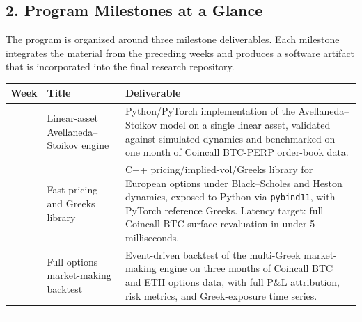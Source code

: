 \documentclass[
]{article}
\newcounter{none} %
\begin{document}
\subsection{2. Program Milestones at a
Glance}\label{program-milestones-at-a-glance}

The program is organized around three milestone deliverables. Each
milestone integrates the material from the preceding weeks and produces
a software artifact that is incorporated into the final research
repository.

{\def\LTcaptype{none} %
\begin{longtable}[]{@{}
  >{\raggedright\arraybackslash}p{}
  >{\raggedright\arraybackslash}p{}
  >{\raggedright\arraybackslash}p{}@{}}
\toprule\noalign{}
\begin{minipage}[b]{\linewidth}\raggedright
Week
\end{minipage} & \begin{minipage}[b]{\linewidth}\raggedright
Title
\end{minipage} & \begin{minipage}[b]{\linewidth}\raggedright
Deliverable
\end{minipage} \\
\midrule\noalign{}
\endhead
\bottomrule\noalign{}
\endlastfoot
5 & Linear-asset Avellaneda--Stoikov engine & Python/PyTorch
implementation of the Avellaneda--Stoikov model on a single linear
asset, validated against simulated dynamics and benchmarked on one month
of Coincall BTC-PERP order-book data. \\
7 & Fast pricing and Greeks library & C++ pricing/implied-vol/Greeks
library for European options under Black--Scholes and Heston dynamics,
exposed to Python via \texttt{pybind11}, with PyTorch reference Greeks.
Latency target: full Coincall BTC surface revaluation in under 5
milliseconds. \\
9 & Full options market-making backtest & Event-driven backtest of the
multi-Greek market-making engine on three months of Coincall BTC and ETH
options data, with full P\&L attribution, risk metrics, and
Greek-exposure time series. \\
\end{longtable}
}

\begin{center}\rule{0.5\linewidth}{0.5pt}\end{center}
\end{document}
